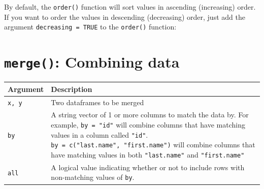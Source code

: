 \documentclass[]{book}
\newenvironment{Shaded}{\begin{snugshade}}{\end{snugshade}}
\newcommand{\KeywordTok}[1]{\textcolor[rgb]{0.13,0.29,0.53}{\textbf{#1}}}
\newcommand{\DataTypeTok}[1]{\textcolor[rgb]{0.13,0.29,0.53}{#1}}
\newcommand{\StringTok}[1]{\textcolor[rgb]{0.31,0.60,0.02}{#1}}
\newcommand{\CommentTok}[1]{\textcolor[rgb]{0.56,0.35,0.01}{\textit{#1}}}
\newcommand{\OtherTok}[1]{\textcolor[rgb]{0.56,0.35,0.01}{#1}}
\newcommand{\OperatorTok}[1]{\textcolor[rgb]{0.81,0.36,0.00}{\textbf{#1}}}
\newcommand{\NormalTok}[1]{#1}
\theoremstyle{definition}
\theoremstyle{definition}
\theoremstyle{remark}
\begin{document}
By default, the \texttt{order()} function will sort values in ascending
(increasing) order. If you want to order the values in descending
(decreasing) order, just add the argument \texttt{decreasing\ =\ TRUE}
to the \texttt{order()} function:

\begin{Shaded}
\end{Shaded}

\section{\texorpdfstring{\texttt{merge()}: Combining
data}{merge(): Combining data}}\label{merge-combining-data}

\begin{longtable}[]{@{}ll@{}}
\toprule
\begin{minipage}[b]{0.18\columnwidth}\raggedright\strut
Argument\strut
\end{minipage} & \begin{minipage}[b]{0.67\columnwidth}\raggedright\strut
Description\strut
\end{minipage}\tabularnewline
\midrule
\endhead
\begin{minipage}[t]{0.18\columnwidth}\raggedright\strut
\texttt{x,\ y}\strut
\end{minipage} & \begin{minipage}[t]{0.67\columnwidth}\raggedright\strut
Two dataframes to be merged\strut
\end{minipage}\tabularnewline
\begin{minipage}[t]{0.18\columnwidth}\raggedright\strut
\texttt{by}\strut
\end{minipage} & \begin{minipage}[t]{0.67\columnwidth}\raggedright\strut
A string vector of 1 or more columns to match the data by. For example,
\texttt{by\ =\ "id"} will combine columns that have matching values in a
column called \texttt{"id"}.
\texttt{by\ =\ c("last.name",\ "first.name")} will combine columns that
have matching values in both \texttt{"last.name"} and
\texttt{"first.name"}\strut
\end{minipage}\tabularnewline
\begin{minipage}[t]{0.18\columnwidth}\raggedright\strut
\texttt{all}\strut
\end{minipage} & \begin{minipage}[t]{0.67\columnwidth}\raggedright\strut
A logical value indicating whether or not to include rows with
non-matching values of \texttt{by}.\strut
\end{minipage}\tabularnewline
\bottomrule
\end{longtable}
\end{document}
